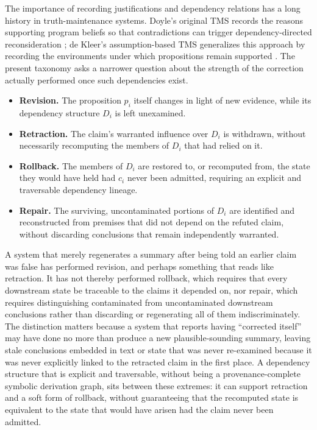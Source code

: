 \documentclass[11pt]{article}
\begin{document}
The importance of recording justifications and dependency relations has a long history in truth-maintenance systems. Doyle's original TMS records the reasons supporting program beliefs so that contradictions can trigger dependency-directed reconsideration \cite{Doyle1979}; de Kleer's assumption-based TMS generalizes this approach by recording the environments under which propositions remain supported \cite{DeKleer1986}. The present taxonomy asks a narrower question about the strength of the correction actually performed once such dependencies exist.

\begin{itemize}[leftmargin=1.6em]
\item \textbf{Revision.} The proposition $p_i$ itself changes in light of new evidence, while its dependency structure $D_i$ is left unexamined.
\item \textbf{Retraction.} The claim's warranted influence over $D_i$ is withdrawn, without necessarily recomputing the members of $D_i$ that had relied on it.
\item \textbf{Rollback.} The members of $D_i$ are restored to, or recomputed from, the state they would have held had $c_i$ never been admitted, requiring an explicit and traversable dependency lineage.
\item \textbf{Repair.} The surviving, uncontaminated portions of $D_i$ are identified and reconstructed from premises that did not depend on the refuted claim, without discarding conclusions that remain independently warranted.
\end{itemize}

A system that merely regenerates a summary after being told an earlier claim was false has performed revision, and perhaps something that reads like retraction. It has not thereby performed rollback, which requires that every downstream state be traceable to the claims it depended on, nor repair, which requires distinguishing contaminated from uncontaminated downstream conclusions rather than discarding or regenerating all of them indiscriminately. The distinction matters because a system that reports having ``corrected itself'' may have done no more than produce a new plausible-sounding summary, leaving stale conclusions embedded in text or state that was never re-examined because it was never explicitly linked to the retracted claim in the first place. A dependency structure that is explicit and traversable, without being a provenance-complete symbolic derivation graph, sits between these extremes: it can support retraction and a soft form of rollback, without guaranteeing that the recomputed state is equivalent to the state that would have arisen had the claim never been admitted.
\end{document}
